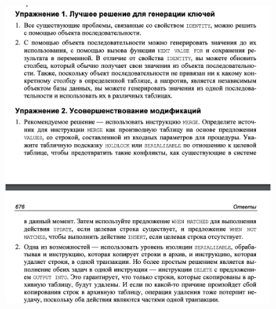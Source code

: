 \begin{figure}[h!]
	\begin{center}
		\includegraphics[width=0.9\textwidth]{img/eans17.png}
	\end{center}
	\captionsetup{justification=centering}
\end{figure}





